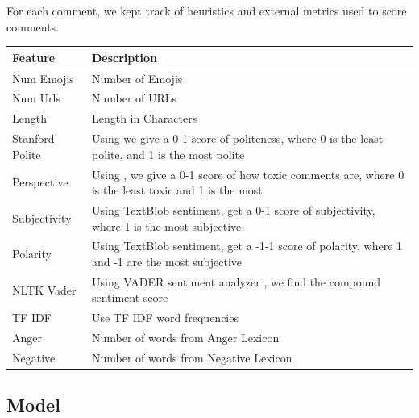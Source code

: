 \documentclass[conference]{IEEEtran}
\begin{document}
For each comment, we kept track of heuristics and external metrics used to score comments. 
\begin{table}[]
	\begin{tabular}{|p{2cm}|p{6cm}|} \hline
		\textbf{Feature} & \textbf{Description}                                                                                        \\ \hline
		Num Emojis       & Number of Emojis                                                                                             \\ \hline
		Num Urls         & Number of URLs                                                                                              \\ \hline
		Length           & Length in Characters                                                                                        \\ \hline
		Stanford Polite  & Using \cite{b8} we give a 0-1 score of politeness, where 0 is the least polite, and 1 is the most polite     \\ \hline
		Perspective      & Using \cite{b7}, we give a 0-1 score of how toxic comments are, where 0 is the least toxic and 1 is the most \\ \hline
		Subjectivity     & Using TextBlob sentiment, get a 0-1 score of subjectivity, where 1 is the most subjective                   \\ \hline
		Polarity         & Using TextBlob sentiment, get a -1-1 score of polarity, where 1 and -1 are the most subjective              \\ \hline
		NLTK Vader       & Using VADER sentiment analyzer \cite{b9}, we find the compound sentiment score                             \\ \hline
		TF IDF           & Use TF IDF word frequencies                                                                                 \\ \hline
		Anger            & Number of words from Anger Lexicon \cite{b10}                                                               \\ \hline
		Negative         & Number of words from Negative Lexicon \cite{b10} \\  \hline                                                           
	\end{tabular}
\end{table}

\subsection{Model} 
\end{document}
